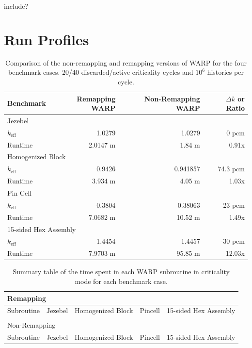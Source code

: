 include?



\section{Run Profiles}

\begin{table}[h]
\centering
\caption{Comparison of the non-remapping and remapping versions of WARP for the four benchmark cases.  20/40 discarded/active criticality cycles and $10^6$ histories per cycle.}
\label{benchmark_nonremapping_summary}
\begin{tabular}{| l | r | r | r |}
 \hline
 Benchmark & Remapping WARP & Non-Remapping WARP & $\Delta k$ or Ratio  \\
\hline
\hline
\multicolumn{4}{|l|}{Jezebel}  \\
\hline
 $k_\mathrm{eff}$ & 1.0279 & 1.0279  & 0 pcm\\
 \hline
 Runtime               &   2.0147 m & 1.84 m & 0.91x \\
 \hline
 \hline
\multicolumn{4}{|l|}{Homogenized Block }\\
\hline
 $k_\mathrm{eff}$ & 0.9426 & 0.941857 & 74.3 pcm  \\
 \hline
 Runtime               &  3.934 m & 4.05 m & 1.03x \\
 \hline
  \hline
\multicolumn{4}{|l|}{Pin Cell}\\
\hline
 $k_\mathrm{eff}$ &  0.3804 & 0.38063  & -23 pcm \\
 \hline
 Runtime               & 7.0682 m & 10.52 m & 1.49x \\
 \hline
  \hline
\multicolumn{4}{|l|}{15-sided Hex Assembly}\\
\hline
 $k_\mathrm{eff}$  & 1.4454  & 1.4457 & -30 pcm \\
 \hline
 Runtime               & 7.9703 m & 95.85 m & 12.03x \\
 \hline
\end{tabular}
\end{table}

\begin{table}[h]
\centering
\caption{Summary table of the time spent in each WARP subroutine in criticality mode for each benchmark case.}
\label{profile_summary}
\begin{tabular}{| l | r  | r | r | r |}
\multicolumn{5}{l}{Remapping} \\
 \hline
 Subroutine & Jezebel & Homogenized Block & Pincell & 15-sided Hex Assembly  \\
\hline
\hline
\multicolumn{5}{l}{} \\
\multicolumn{5}{l}{Non-Remapping} \\
 \hline
 Subroutine & Jezebel & Homogenized Block & Pincell & 15-sided Hex Assembly  \\
\hline
\hline
\end{tabular}
\end{table}

